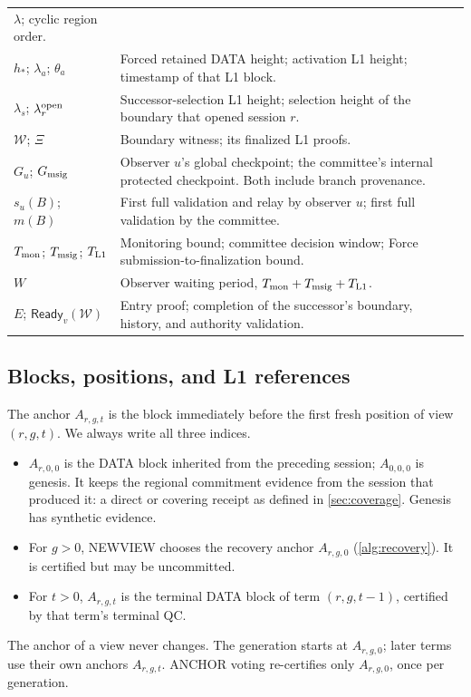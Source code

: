 \documentclass[11pt,a4paper]{article}
\newcommand{\tagg}[1]{\ensuremath{\mathsf{#1}}}
\begin{document}
\begin{table}[htbp]
\begin{tabularx}{\linewidth}{@{}p{.29\linewidth}Y@{}}
$\lambda$; cyclic region order.\\
$h_*$; $\lambda_a$; $\theta_a$ & Forced retained DATA height;
activation L1 height; timestamp of that L1 block.\\
$\lambda_s$; $\lambda_r^{\rm open}$ & Successor-selection L1 height;
selection height of the boundary that opened session $r$.\\
$\mathcal W$; $\Xi$ & Boundary witness; its finalized L1 proofs.\\
$G_u$; $G_{\rm msig}$ & Observer $u$'s global checkpoint; the committee's internal
protected checkpoint. Both include branch provenance.\\
$s_u(B)$; $m(B)$ & First full validation and relay by observer $u$;
first full validation by the committee.\\
$T_{\rm mon}$; $T_{\rm msig}$; $T_{\rm L1}$ & Monitoring bound;
committee decision window; Force submission-to-finalization bound.\\
$W$ & Observer waiting period,
$T_{\rm mon}+T_{\rm msig}+T_{\rm L1}$.\\
$E$; $\tagg{Ready}_v(\mathcal W)$ & Entry proof; completion of the
successor's boundary, history, and authority validation.\\
\bottomrule
\end{tabularx}
\end{table}

\subsection{Blocks, positions, and L1 references}
\label{sec:blocks}
The anchor $A_{r,g,t}$ is the block immediately before the first fresh
position of view $(r,g,t)$. We always write all three indices.
\begin{itemize}
\item $A_{r,0,0}$ is the DATA block inherited from the preceding
session; $A_{0,0,0}$ is genesis. It keeps the regional commitment evidence from the session that
produced it: a direct or covering receipt as defined in
\cref{sec:coverage}. Genesis has synthetic evidence.
\item For $g>0$, NEWVIEW chooses the recovery anchor $A_{r,g,0}$
(\cref{alg:recovery}). It is certified but may be uncommitted.
\item For $t>0$, $A_{r,g,t}$ is the terminal DATA block of term
$(r,g,t-1)$, certified by that term's terminal QC.
\end{itemize}
The anchor of a view never changes. The generation starts at
$A_{r,g,0}$; later terms use their own anchors $A_{r,g,t}$. ANCHOR voting
re-certifies only $A_{r,g,0}$, once per generation.
\end{document}
